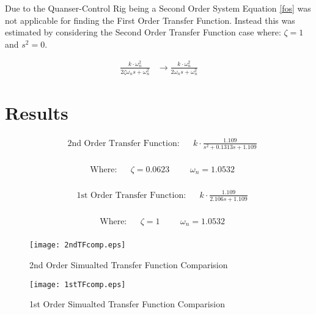 Due to the Quanser-Control Rig being a Second Order System Equation
\ref{fos} was not applicable for finding the First Order Transfer
Function. Instead this was estimated by considering the Second Order
Transfer Function case where: \(\zeta =1\) and \(s^2=0\).

\begin{align}
\frac { k\cdot \omega_{ n }^{ 2 } }{ 2\zeta \omega_{ n }s+\omega_{ n }^{ 2 } } &\rightarrow \frac { k\cdot \omega_{ n }^{ 2 } }{ 2\omega_{ n }s+\omega_{ n }^{ 2 } }
\end{align}

\section{Results}\label{results}

\begin{align}
&\text{2nd Order Transfer Function}: && k \cdot \frac { 1.109 }{ s^{ 2 }+0.1313s+1.109 }
\end{align}

\begin{align*}
\\
&\text{Where:} &&\zeta = 0.0623 &&& \omega_n = 1.0532
\\
\end{align*}

\begin{align}
&\text{1st Order Transfer Function}: && k \cdot \frac { 1.109 }{ 2.106s+1.109 }
\end{align}

\begin{align*}
\\
&\text{Where:} &&\zeta = 1 &&& \omega_n = 1.0532
\\
\end{align*}

\begin{figure}[H]
\centering
\begin{minipage}{.49\textwidth}
\centering
\texttt{[image: 2ndTFcomp.eps]}
\caption{2nd Order Simualted Transfer Function Comparision}
\label{2ndTFcomp}
\end{minipage}
\hfill
\begin{minipage}{.49\textwidth}
  \centering
  \texttt{[image: 1stTFcomp.eps]}
  \caption{1st Order Simualted Transfer Function Comparision}
  \label{1stTFcomp}
\end{minipage}
\vspace{-11pt}
\end{figure}

